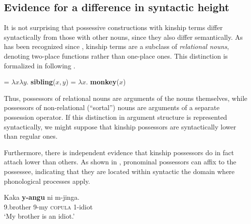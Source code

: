 \documentclass[output=paper
,newtxmath
,modfonts
,nonflat]{langsci/langscibook}
\begin{document}
\ea\label{ex:pesetsky:crastton} 
      
  \z \z



\subsection{Evidence for a difference in syntactic height}\label{sec:pesetsky:syntacticheight}

It is not surprising that possessive constructions with kinship terms differ syntactically from those with other nouns, since they also differ semantically.  As has been recognized since \citet{partee8397}, kinship terms are a subclass of \textit{relational nouns}, denoting two-place functions rather than one-place ones. This distinction is formalized in  following \citet{barker95}.

\ea\label{ex:pesetsky:lfkwakweli} \ea\label{ex:pesetsky:lfkwakwelia} {  = $\lambda x \lambda y$. \textbf{sibling}($x,y$) }
\ex\label{ex:pesetsky:lfkwakwelib} {  = $\lambda x.$ \textbf{monkey}($x$) \\ } \z \z

Thus, possessors of relational nouns are arguments of the nouns themselves, while possessors of non-relational (``sortal'') nouns are arguments of a separate possession operator. If this distinction in argument structure is represented syntactically, we might suppose that kinship possessors are syntactically lower than regular ones. 

Furthermore, there is independent evidence that kinship possessors do in fact attach lower than others. As shown in , pronominal possessors can affix to the possessee, indicating that they are located within syntactic the domain where phonological processes apply.

\ea\label{ex:pesetsky:kakayangu}  \ea\label{ex:pesetsky:kakayangua}{ \gll Kaka \textbf{y-angu} ni m-jinga. \\ \textsc{9}.brother \textsc{9}-my \textsc{copula} \textsc{1}-idiot \\ \glt `My brother is an idiot.'  \\}
 \z \z
\end{document}
